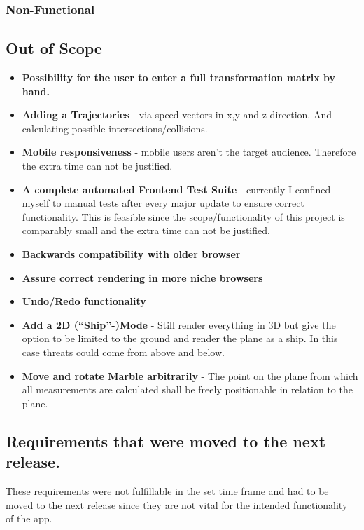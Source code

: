 \subsubsection{Non-Functional}


\subsection{Out of Scope}
\begin{itemize}
\item \textbf{Possibility for the user to enter a full transformation matrix by hand.}
\item \textbf{Adding a Trajectories} - via speed vectors in x,y and z direction. And calculating possible intersections/collisions.
\item \textbf{Mobile responsiveness} - mobile users aren't the target audience. Therefore the extra time can not be justified.
\item \textbf{A complete automated Frontend Test Suite} - currently I confined myself to manual tests after every major update to ensure correct functionality. This is feasible since the scope/functionality of this project is comparably small and the extra time can not be justified.
\item \textbf{Backwards compatibility with older browser}
\item \textbf{Assure correct rendering in more niche browsers}
\item \textbf{Undo/Redo functionality}
\item \textbf{Add a 2D (\enquote{Ship}-)Mode} - Still render everything in 3D but give the option to be limited to the ground and render the plane as a ship. In this case threats could come from above and below.
\item \textbf{Move and rotate Marble arbitrarily} - The point on the plane from which all measurements are calculated shall be freely positionable in relation to the plane.
\end{itemize}

\subsection{Requirements that were moved to the next release.}

These requirements were not fulfillable in the set time frame and had to be moved to the next release since they are not vital for the intended functionality of the app.

